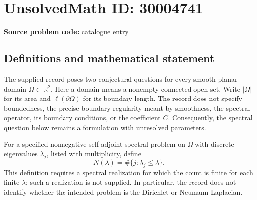 \documentclass[11pt]{article}
\newcommand{\R}{\mathbb{R}}
\begin{document}
\section*{UnsolvedMath ID: 30004741}
\textbf{Source problem code:} catalogue entry
\subsection{Definitions and mathematical statement}
The supplied record poses two conjectural questions for every smooth planar domain \(\Omega\subset\R^2\). Here a domain means a nonempty connected open set. Write \(|\Omega|\) for its area and \(\ell(\partial\Omega)\) for its boundary length. The record does not specify boundedness, the precise boundary regularity meant by smoothness, the spectral operator, its boundary conditions, or the coefficient \(C\). Consequently, the spectral question below remains a formulation with unresolved parameters.

For a specified nonnegative self-adjoint spectral problem on \(\Omega\) with discrete eigenvalues \(\lambda_j\), listed with multiplicity, define
\[
N(\lambda)=\#\{j:\lambda_j\leq\lambda\}.
\]
This definition requires a spectral realization for which the count is finite for each finite \(\lambda\); such a realization is not supplied. In particular, the record does not identify whether the intended problem is the Dirichlet or Neumann Laplacian.
\end{document}
